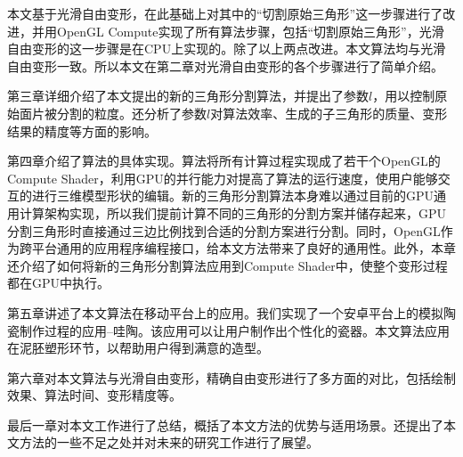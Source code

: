 本文基于光滑自由变形，在此基础上对其中的“切割原始三角形”这一步骤进行了改进，并用OpenGL Compute实现了所有算法步骤，包括“切割原始三角形”，光滑自由变形的这一步骤是在CPU上实现的。除了以上两点改进。本文算法均与光滑自由变形一致。所以本文在第二章对光滑自由变形\cite{Cui15}的各个步骤进行了简单介绍。

第三章详细介绍了本文提出的新的三角形分割算法，并提出了参数$l$，用以控制原始面片被分割的粒度。还分析了参数$l$对算法效率、生成的子三角形的质量、变形结果的精度等方面的影响。

第四章介绍了算法的具体实现。算法将所有计算过程实现成了若干个OpenGL的Compute Shader，利用GPU的并行能力对提高了算法的运行速度，使用户能够交互的进行三维模型形状的编辑。新的三角形分割算法本身难以通过目前的GPU通用计算架构实现，所以我们提前计算不同的三角形的分割方案并储存起来，GPU分割三角形时直接通过三边比例找到合适的分割方案进行分割。同时，OpenGL作为跨平台通用的应用程序编程接口，给本文方法带来了良好的通用性。此外，本章还介绍了如何将新的三角形分割算法应用到Compute Shader中，使整个变形过程都在GPU中执行。

第五章讲述了本文算法在移动平台上的应用。我们实现了一个安卓平台上的模拟陶瓷制作过程的应用--哇陶。该应用可以让用户制作出个性化的瓷器。本文算法应用在泥胚塑形环节，以帮助用户得到满意的造型。

第六章对本文算法与光滑自由变形\cite{Cui15}，精确自由变形\cite{Feng00}进行了多方面的对比，包括绘制效果、算法时间、变形精度等。

最后一章对本文工作进行了总结，概括了本文方法的优势与适用场景。还提出了本文方法的一些不足之处并对未来的研究工作进行了展望。




